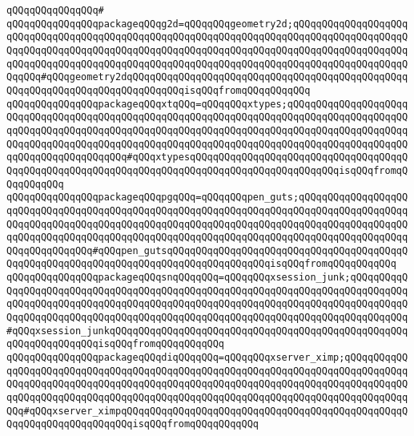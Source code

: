 \verb|qQQqqQQqqQQqqQQq#|\newline
\verb|qQQqqQQqqQQqqQQqpackageqQQqg2d=qQQqqQQqgeometry2d;qQQqqQQqqQQqqQQqqQQqqQQqqQQqqQQqqQQqqQQqqQQqqQQqqQQqqQQqqQQqqQQqqQQqqQQqqQQqqQQqqQQqqQQqqQQqqQQqqQQqqQQqqQQqqQQqqQQqqQQqqQQqqQQqqQQqqQQqqQQqqQQqqQQqqQQqqQQqqQQqqQQqqQQqqQQqqQQqqQQqqQQqqQQqqQQqqQQqqQQqqQQqqQQqqQQqqQQqqQQqqQQqqQQqqQQqqQQq#qQQqgeometry2dqQQqqQQqqQQqqQQqqQQqqQQqqQQqqQQqqQQqqQQqqQQqqQQqqQQqqQQqqQQqqQQqqQQqqQQqqQQqqQQqisqQQqfromqQQqqQQqqQQq|\newline
\verb|qQQqqQQqqQQqqQQqpackageqQQqxtqQQq=qQQqqQQqxtypes;qQQqqQQqqQQqqQQqqQQqqQQqqQQqqQQqqQQqqQQqqQQqqQQqqQQqqQQqqQQqqQQqqQQqqQQqqQQqqQQqqQQqqQQqqQQqqQQqqQQqqQQqqQQqqQQqqQQqqQQqqQQqqQQqqQQqqQQqqQQqqQQqqQQqqQQqqQQqqQQqqQQqqQQqqQQqqQQqqQQqqQQqqQQqqQQqqQQqqQQqqQQqqQQqqQQqqQQqqQQqqQQqqQQqqQQqqQQqqQQqqQQqqQQqqQQq#qQQqxtypesqQQqqQQqqQQqqQQqqQQqqQQqqQQqqQQqqQQqqQQqqQQqqQQqqQQqqQQqqQQqqQQqqQQqqQQqqQQqqQQqqQQqqQQqqQQqqQQqisqQQqfromqQQqqQQqqQQq|\newline
\verb|qQQqqQQqqQQqqQQqpackageqQQqpgqQQq=qQQqqQQqpen_guts;qQQqqQQqqQQqqQQqqQQqqQQqqQQqqQQqqQQqqQQqqQQqqQQqqQQqqQQqqQQqqQQqqQQqqQQqqQQqqQQqqQQqqQQqqQQqqQQqqQQqqQQqqQQqqQQqqQQqqQQqqQQqqQQqqQQqqQQqqQQqqQQqqQQqqQQqqQQqqQQqqQQqqQQqqQQqqQQqqQQqqQQqqQQqqQQqqQQqqQQqqQQqqQQqqQQqqQQqqQQqqQQqqQQqqQQqqQQqqQQqqQQq#qQQqpen_gutsqQQqqQQqqQQqqQQqqQQqqQQqqQQqqQQqqQQqqQQqqQQqqQQqqQQqqQQqqQQqqQQqqQQqqQQqqQQqqQQqqQQqqQQqisqQQqfromqQQqqQQqqQQq|\newline
\verb|qQQqqQQqqQQqqQQqpackageqQQqsnqQQqqQQq=qQQqqQQqxsession_junk;qQQqqQQqqQQqqQQqqQQqqQQqqQQqqQQqqQQqqQQqqQQqqQQqqQQqqQQqqQQqqQQqqQQqqQQqqQQqqQQqqQQqqQQqqQQqqQQqqQQqqQQqqQQqqQQqqQQqqQQqqQQqqQQqqQQqqQQqqQQqqQQqqQQqqQQqqQQqqQQqqQQqqQQqqQQqqQQqqQQqqQQqqQQqqQQqqQQqqQQqqQQqqQQqqQQqqQQqqQQq#qQQqxsession_junkqQQqqQQqqQQqqQQqqQQqqQQqqQQqqQQqqQQqqQQqqQQqqQQqqQQqqQQqqQQqqQQqqQQqisqQQqfromqQQqqQQqqQQq|\newline
\verb|qQQqqQQqqQQqqQQqpackageqQQqdiqQQqqQQq=qQQqqQQqxserver_ximp;qQQqqQQqqQQqqQQqqQQqqQQqqQQqqQQqqQQqqQQqqQQqqQQqqQQqqQQqqQQqqQQqqQQqqQQqqQQqqQQqqQQqqQQqqQQqqQQqqQQqqQQqqQQqqQQqqQQqqQQqqQQqqQQqqQQqqQQqqQQqqQQqqQQqqQQqqQQqqQQqqQQqqQQqqQQqqQQqqQQqqQQqqQQqqQQqqQQqqQQqqQQqqQQqqQQqqQQqqQQqqQQq#qQQqxserver_ximpqQQqqQQqqQQqqQQqqQQqqQQqqQQqqQQqqQQqqQQqqQQqqQQqqQQqqQQqqQQqqQQqqQQqqQQqisqQQqfromqQQqqQQqqQQq|\newline
